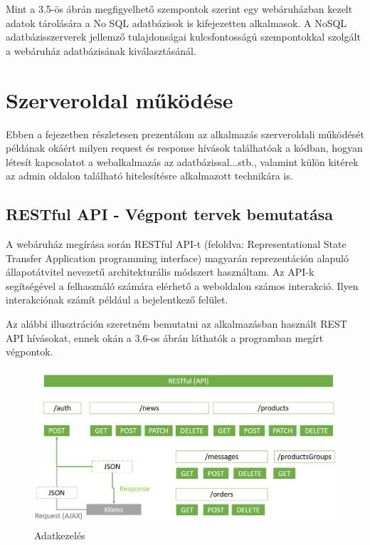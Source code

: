 Mint a 3.5-ös ábrán megfigyelhető szempontok szerint egy webáruházban kezelt adatok tárolására a No SQL adatbázisok is kifejezetten alkalmasok. A NoSQL adatbázisszerverek jellemző tulajdonságai kulcsfontosságú szempontokkal szolgált a webáruház adatbázisának kiválasztásánál.

\section{Szerveroldal működése}

Ebben a fejezetben részletesen prezentálom az alkalmazás szerveroldali működését példának okáért milyen request és response hívások találhatóak a kódban, hogyan létesít kapcsolatot a webalkalmazás az adatbázissal...stb., valamint külön kitérek az admin oldalon található hitelesítésre alkalmazott technikára is.

\subsection{RESTful API - Végpont tervek bemutatása}

A webáruház megírása során RESTful API-t (feloldva: Representational State Transfer Application programming interface) magyarán reprezentáción alapuló állapotátvitel nevezetű architekturális módszert használtam. Az API-k segítségével a felhasználó számára elérhető a weboldalon számos interakció. Ilyen interakciónak számít például a bejelentkező felület.

\bigskip
Az alábbi illusztráción szeretném bemutatni az alkalmazásban használt REST API hívásokat, ennek okán a 3.6-os ábrán láthatók a programban megírt végpontok.


\begin{figure}[H]
	\centering
	\includegraphics[width=1.0\textwidth,height=220px]{images/restapi_bemutatasa.png}
	\caption{Adatkezelés}
	\label{fig.picture-8}
\end{figure}

